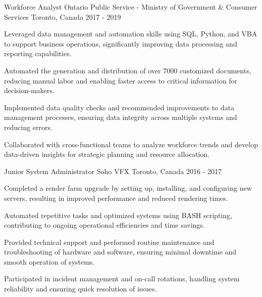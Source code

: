 \begin{cventries}
\cventry
	{Workforce Analyst}
	{Ontario Public Service - Ministry of Government \& Consumer Services}
	{Toronto, Canada}
	{2017 - 2019}
	{
		\begin{cvitems}
			\item Leveraged data management and automation skills using SQL, Python, and VBA to support business operations, significantly improving data processing and reporting capabilities.
			\item Automated the generation and distribution of over 7000 customized documents, reducing manual labor and enabling faster access to critical information for decision-makers.
			\item Implemented data quality checks and recommended improvements to data management processes, ensuring data integrity across multiple systems and reducing errors.
			\item Collaborated with cross-functional teams to analyze workforce trends and develop data-driven insights for strategic planning and resource allocation.
		\end{cvitems}
	}

\cventry
	{Junior System Administrator}
	{Soho VFX}
	{Toronto, Canada}
	{2016 - 2017}
	{
		\begin{cvitems}
			\item Completed a render farm upgrade by setting up, installing, and configuring new servers, resulting in improved performance and reduced rendering times.
			\item Automated repetitive tasks and optimized systems using BASH scripting, contributing to ongoing operational efficiencies and time savings.
			\item Provided technical support and performed routine maintenance and troubleshooting of hardware and software, ensuring minimal downtime and smooth operation of systems.
			\item Participated in incident management and on-call rotations, handling system reliability and ensuring quick resolution of issues.
		\end{cvitems}
	}

\end{cventries}
